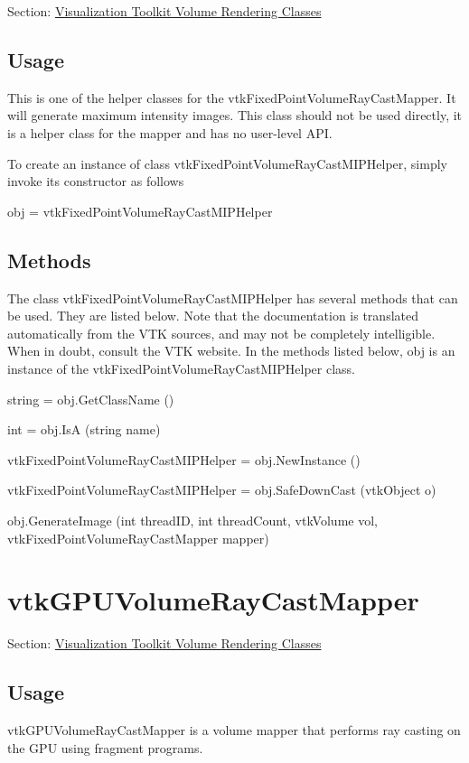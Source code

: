 Section\-: \hyperlink{sec_vtkvolumerendering}{Visualization Toolkit Volume Rendering Classes} \hypertarget{vtkwidgets_vtkxyplotwidget_Usage}{}\subsection{Usage}\label{vtkwidgets_vtkxyplotwidget_Usage}
This is one of the helper classes for the vtk\-Fixed\-Point\-Volume\-Ray\-Cast\-Mapper. It will generate maximum intensity images. This class should not be used directly, it is a helper class for the mapper and has no user-\/level A\-P\-I.

To create an instance of class vtk\-Fixed\-Point\-Volume\-Ray\-Cast\-M\-I\-P\-Helper, simply invoke its constructor as follows \begin{DoxyVerb}  obj = vtkFixedPointVolumeRayCastMIPHelper
\end{DoxyVerb}
 \hypertarget{vtkwidgets_vtkxyplotwidget_Methods}{}\subsection{Methods}\label{vtkwidgets_vtkxyplotwidget_Methods}
The class vtk\-Fixed\-Point\-Volume\-Ray\-Cast\-M\-I\-P\-Helper has several methods that can be used. They are listed below. Note that the documentation is translated automatically from the V\-T\-K sources, and may not be completely intelligible. When in doubt, consult the V\-T\-K website. In the methods listed below, {\ttfamily obj} is an instance of the vtk\-Fixed\-Point\-Volume\-Ray\-Cast\-M\-I\-P\-Helper class. 
\begin{DoxyItemize}
\item {\ttfamily string = obj.\-Get\-Class\-Name ()}  
\item {\ttfamily int = obj.\-Is\-A (string name)}  
\item {\ttfamily vtk\-Fixed\-Point\-Volume\-Ray\-Cast\-M\-I\-P\-Helper = obj.\-New\-Instance ()}  
\item {\ttfamily vtk\-Fixed\-Point\-Volume\-Ray\-Cast\-M\-I\-P\-Helper = obj.\-Safe\-Down\-Cast (vtk\-Object o)}  
\item {\ttfamily obj.\-Generate\-Image (int thread\-I\-D, int thread\-Count, vtk\-Volume vol, vtk\-Fixed\-Point\-Volume\-Ray\-Cast\-Mapper mapper)}  
\end{DoxyItemize}\hypertarget{vtkvolumerendering_vtkgpuvolumeraycastmapper}{}\section{vtk\-G\-P\-U\-Volume\-Ray\-Cast\-Mapper}\label{vtkvolumerendering_vtkgpuvolumeraycastmapper}
Section\-: \hyperlink{sec_vtkvolumerendering}{Visualization Toolkit Volume Rendering Classes} \hypertarget{vtkwidgets_vtkxyplotwidget_Usage}{}\subsection{Usage}\label{vtkwidgets_vtkxyplotwidget_Usage}
vtk\-G\-P\-U\-Volume\-Ray\-Cast\-Mapper is a volume mapper that performs ray casting on the G\-P\-U using fragment programs.

